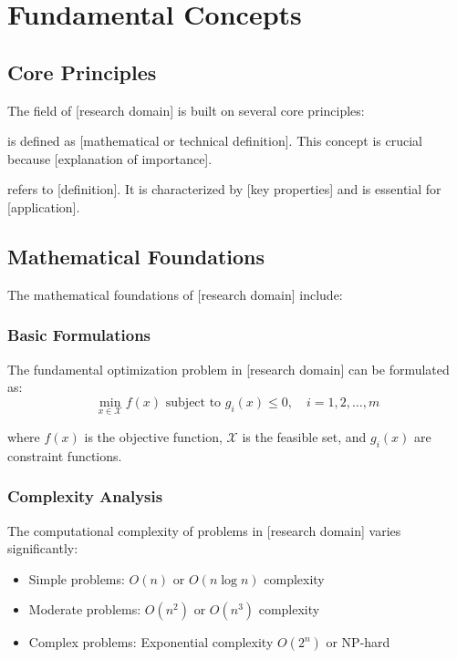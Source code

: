 \section{Fundamental Concepts}

\subsection{Core Principles}

The field of [research domain] is built on several core principles:

\begin{definition} is defined as [mathematical or technical definition]. This concept is crucial because [explanation of importance].
\end{definition}

\begin{definition} refers to [definition]. It is characterized by [key properties] and is essential for [application].
\end{definition}

\subsection{Mathematical Foundations}

The mathematical foundations of [research domain] include:

\subsubsection{Basic Formulations}

The fundamental optimization problem in [research domain] can be formulated as:
\begin{equation}
\min_{x \in \mathcal{X}} f(x) \text{ subject to } g_i(x) \leq 0, \quad i = 1, 2, \ldots, m
\label{eq:basic-formulation}
\end{equation}

where $f(x)$ is the objective function, $\mathcal{X}$ is the feasible set, and $g_i(x)$ are constraint functions.

\subsubsection{Complexity Analysis}

The computational complexity of problems in [research domain] varies significantly:
\begin{itemize}
    \item Simple problems: $O(n)$ or $O(n \log n)$ complexity
    \item Moderate problems: $O(n^2)$ or $O(n^3)$ complexity  
    \item Complex problems: Exponential complexity $O(2^n)$ or NP-hard
\end{itemize}

